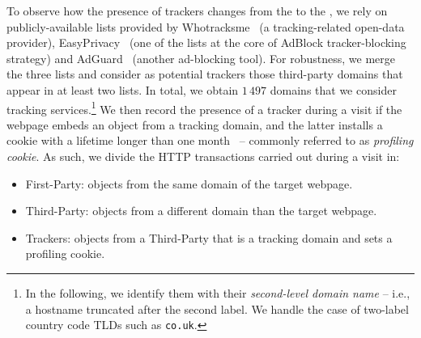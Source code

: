 To observe how the presence of trackers changes from the \BEFORE to the \AFTER, we rely on publicly-available lists provided by Whotracksme~\cite{whotracksme} (a tracking-related open-data provider), EasyPrivacy~\cite{easyprivacy} (one of the lists at the core of AdBlock tracker-blocking strategy) and AdGuard~\cite{adguard} (another ad-blocking tool). For robustness, we merge the three lists and consider as potential trackers those third-party domains that appear in at least two lists. In total, we obtain $1\,497$ domains that we consider tracking services.\footnote{In the following, we identify them with their \emph{second-level domain name} -- i.e., a hostname truncated after the second label. We handle the case of two-label country code TLDs such as \texttt{co.uk}.} We then record the presence of a tracker during a visit if the webpage embeds an object from a tracking domain, and the latter installs a cookie with a lifetime longer than one month~\cite{trevisan20194} -- commonly referred to as \textit{profiling cookie}. As such, we divide the HTTP transactions carried out during a visit in: 
\begin{itemize}
    \item First-Party: objects from the same domain of the target webpage.
    \item Third-Party: objects from a different domain than the target webpage.
    \item Trackers: objects from a Third-Party that is a tracking domain and sets a profiling cookie.
\end{itemize}